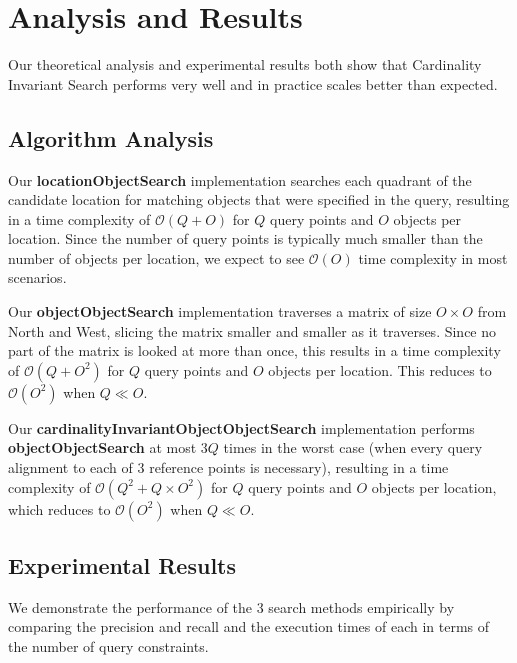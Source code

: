 \section{Analysis and Results}
\label{section:results}

Our theoretical analysis and experimental results both show that Cardinality Invariant Search performs very well and in practice scales better than expected.

\subsection{Algorithm Analysis}

Our \textbf{locationObjectSearch} implementation searches each quadrant of the candidate location for matching objects that were specified in the query, resulting in a time complexity of $\mathcal{O}(Q + O)$ for $Q$ query points and $O$ objects per location. 
Since the number of query points is typically much smaller than the number of objects per location, we expect to see $\mathcal{O}(O)$ time complexity in most scenarios.

Our \textbf{objectObjectSearch} implementation traverses a matrix of size $O \times O$ from North and West, slicing the matrix smaller and smaller as it traverses. 
Since no part of the matrix is looked at more than once, this results in a time complexity of $\mathcal{O}(Q + O^2)$ for $Q$ query points and $O$ objects per location. 
This reduces to $\mathcal{O}(O^2)$ when $Q \ll O$. %

Our \textbf{cardinalityInvariantObjectObjectSearch} implementation performs \textbf{objectObjectSearch} at most $3Q$ times in the worst case (when every query alignment to each of 3 reference points is necessary), resulting in a time complexity of $\mathcal{O}(Q^2 + Q\times O^2)$ for $Q$ query points and $O$ objects per location, which reduces to $\mathcal{O}(O^2)$ when $Q \ll O$. 


\subsection{Experimental Results}
We demonstrate the performance of the 3 search methods empirically by comparing the precision and recall and the execution times of each in terms of the number of query constraints. 

